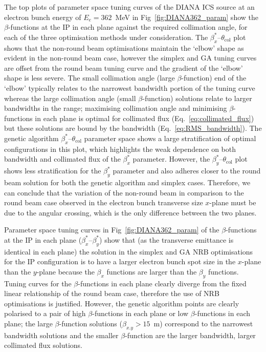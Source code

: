 \documentclass[../main.tex]{subfiles}
\begin{document}
The top plots of parameter space tuning curves of the DIANA ICS source at an electron bunch energy of $E_{e}=362$~\si{\mega\electronvolt} in Fig~\ref{fig:DIANA362_param} show the $\beta$-functions at the IP in each plane against the required collimation angle, for each of the three optimisation methods under consideration. The $\beta_{x}^{*}$--$\theta_{\mathrm{col}}$ plot shows that the non-round beam optimisations maintain the `elbow' shape as evident in the non-round beam case, however the simplex and GA tuning curves are offset from the round beam tuning curve and the gradient of the `elbow' shape is less severe. The small collimation angle (large $\beta$-function) end of the `elbow' typically relates to the narrowest bandwidth portion of the tuning curve whereas the large collimation angle (small $\beta$-function) solutions relate to larger bandwidths in the range; maximising collimation angle and minimising $\beta$-functions in each plane is optimal for collimated flux (Eq.~\ref{eq:collimated_flux}) but these solutions are bound by the bandwidth (Eq.~\ref{eq:RMS_bandwidth}). The genetic algorithm $\beta_{x}^{*}$--$\theta_{\mathrm{col}}$ parameter space shows a large stratification of optimal configurations in this plot, which highlights the weak dependence on both bandwidth and collimated flux of the $\beta_{x}^{*}$ parameter. However, the $\beta_{y}^{*}$--$\theta_{\mathrm{col}}$ plot shows less stratification for the $\beta_{y}^{*}$ parameter and also adheres closer to the round beam solution for both the genetic algorithm and simplex cases. Therefore, we can conclude that the variation of the non-round beam in comparison to the round beam case observed in the electron bunch transverse size $x$-plane must be due to the angular crossing, which is the only difference between the two planes.

Parameter space tuning curves in Fig~\ref{fig:DIANA362_param} of the $\beta$-functions at the IP in each plane ($\beta_{x}^{*}$--$\beta_{y}^{*}$) show that (as the transverse emittance is identical in each plane) the solution in the simplex and GA NRB optimisations for the IP configuration is to have a larger electron bunch spot size in the $x$-plane than the $y$-plane because the $\beta_{x}$ functions are larger than the $\beta_{y}$ functions. Tuning curves for the $\beta$-functions in each plane clearly diverge from the fixed linear relationship of the round beam case, therefore the use of NRB optimisations is justified. However, the genetic algorithm points are clearly polarised to a pair of high $\beta$-functions in each plane or low $\beta$-functions in each plane; the large $\beta$-function solutions ($\beta_{x.y}>15$~\si{\meter}) correspond to the narrowest bandwidth solutions and the smaller $\beta$-function are the larger bandwidth, larger collimated flux solutions.
\end{document}
